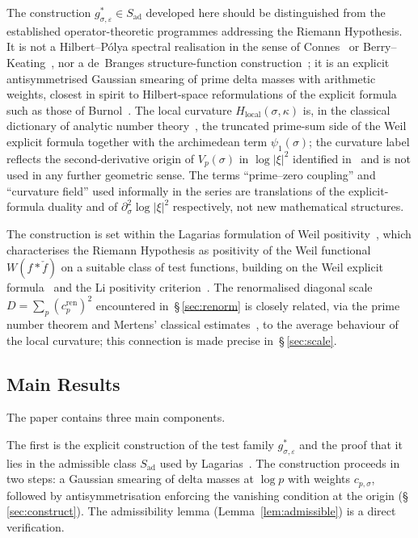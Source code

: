 \documentclass[11pt]{article}
\newcommand{\Hlocal}{H_{\mathrm{local}}}
\newcommand{\Sad}{S_{\mathrm{ad}}}
\newcommand{\cren}{c_p^{\mathrm{ren}}}
\begin{document}
The construction $g^*_{\sigma,\varepsilon}\in\Sad$ developed here
should be distinguished from the established operator-theoretic
programmes addressing the Riemann Hypothesis.
It is not a Hilbert--P\'olya spectral realisation in the sense of
Connes~\cite{Connes} or Berry--Keating~\cite{BerryKeating}, nor a
de~Branges structure-function construction~\cite{deBranges}; it
is an explicit antisymmetrised Gaussian smearing of prime delta
masses with arithmetic weights, closest in spirit to Hilbert-space
reformulations of the explicit formula such as those of
Burnol~\cite{Burnol}.
The local curvature $\Hlocal(\sigma,\kappa)$ is, in the classical
dictionary of analytic number theory~\cite{Edwards}, the truncated
prime-sum side of the Weil explicit formula together with the
archimedean term $\psi_1(\sigma)$; the curvature label reflects the
second-derivative origin of $V_p(\sigma)$ in $\log|\xi|^2$
identified in~\cite{Paper1} and is not used in any further
geometric sense.
The terms ``prime--zero coupling'' and ``curvature field'' used
informally in the series are translations of the explicit-formula
duality and of $\partial_\sigma^2\log|\xi|^2$ respectively, not
new mathematical structures.

The construction is set within the Lagarias formulation of Weil
positivity~\cite{Lagarias}, which characterises the Riemann
Hypothesis as positivity of the Weil functional $W(f*\check f)$
on a suitable class of test functions, building on the Weil
explicit formula~\cite{Weil} and the Li positivity
criterion~\cite{Li}.
The renormalised diagonal scale $D=\sum_p(\cren)^2$ encountered
in~\S\,\ref{sec:renorm} is closely related, via the prime number
theorem and Mertens' classical estimates~\cite{Mertens}, to the
average behaviour of the local curvature; this connection is
made precise in~\S\,\ref{sec:scale}.

\subsection{Main Results}

The paper contains three main components.

The first is the explicit construction of the test family
$g^*_{\sigma,\varepsilon}$ and the proof that it lies in the
admissible class $\Sad$ used by Lagarias~\cite{Lagarias}.
The construction proceeds in two steps: a Gaussian smearing of
delta masses at $\log p$ with weights $c_{p,\sigma}$, followed
by antisymmetrisation enforcing the vanishing condition at the
origin (\S\,\ref{sec:construct}).
The admissibility lemma (Lemma~\ref{lem:admissible}) is a
direct verification.
\end{document}
